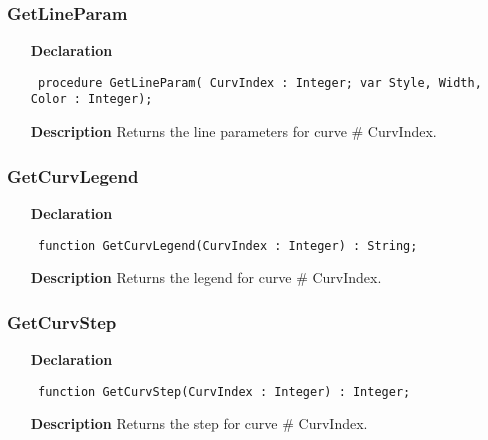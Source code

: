 \documentclass[12pt,a4paper,oneside]{report}
\newcommand{\declarationitem}[1]{\textbf{#1}}
\newcommand{\descriptiontitle}[1]{\textbf{#1}}
\newcommand{\code}[1]{\texttt{#1}}
\begin{document}
\subsubsection{GetLineParam}
\label{uplot-GetLineParam}
\begin{itemize}\item[\declarationitem{Declaration}\hfill]
	\begin{flushleft}
		\code{
			procedure GetLineParam( CurvIndex : Integer; var Style, Width, Color : Integer);}
		
	\end{flushleft}
	
	\par
	\item[\descriptiontitle{Description}]
	Returns the line parameters for curve {\#} CurvIndex.
	
\end{itemize}
\subsubsection{GetCurvLegend}
\label{uplot-GetCurvLegend}
\begin{itemize}\item[\declarationitem{Declaration}\hfill]
	\begin{flushleft}
		\code{
			function GetCurvLegend(CurvIndex : Integer) : String;}
		
	\end{flushleft}
	
	\par
	\item[\descriptiontitle{Description}]
	Returns the legend for curve {\#} CurvIndex.
	
\end{itemize}
\subsubsection{GetCurvStep}
\label{uplot-GetCurvStep}
\begin{itemize}\item[\declarationitem{Declaration}\hfill]
	\begin{flushleft}
		\code{
			function GetCurvStep(CurvIndex : Integer) : Integer;}
		
	\end{flushleft}
	
	\par
	\item[\descriptiontitle{Description}]
	Returns the step for curve {\#} CurvIndex.
	
\end{itemize}
\end{document}
